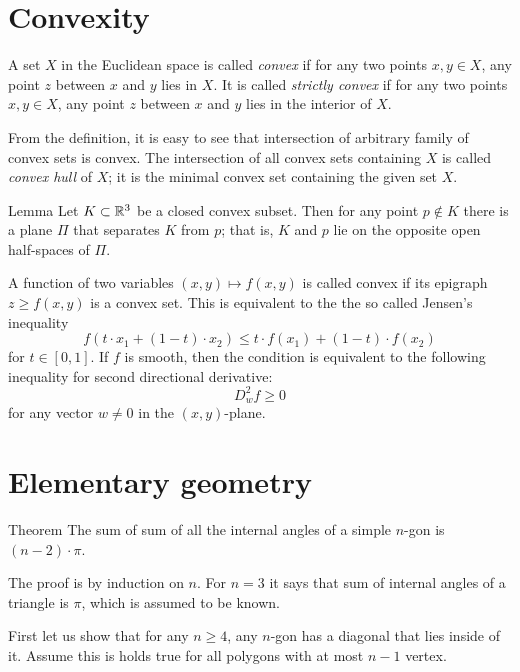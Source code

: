 \section{Convexity}

A set $X$ in the Euclidean space is called \emph{convex} if for any two points $x,y\in X$, any point $z$ between $x$ and $y$ lies in $X$.
It is called  \emph{strictly convex} if for any two points $x,y\in X$, any point $z$ between $x$ and $y$ lies in the interior of $X$.

From the definition, it is easy to see that intersection of arbitrary family of convex sets is convex. 
The intersection of all convex sets containing $X$ is called \emph{convex hull} of $X$;
it is the minimal convex set containing the given set $X$.


\begin{thm}{Lemma}\label{lem:separation}
Let $K\subset \mathbb{R}^3$ be a closed convex subset.
Then for any point $p\notin K$ there is a plane $\Pi$ that separates $K$ from $p$;
that is, $K$ and $p$ lie on the opposite open half-spaces of $\Pi$.
\end{thm}

A function of two variables $(x,y)\mapsto f(x,y)$ is called convex if 
its epigraph $z\ge f(x,y)$ is a convex set.
This is equivalent to the the so called Jensen's inequality
\[f \left (t\cdot x_1 + (1-t)\cdot x_2 \right ) \leq t\cdot f(x_1)+ (1-t)\cdot f(x_2)\]
for $t\in[0,1]$.
If $f$ is smooth, then the condition is equivalent to the following inequality for second directional derivative:
\[D^2_wf\ge 0\]
for any vector $w\ne 0$ in the $(x,y)$-plane.



\section{Elementary geometry}

\begin{thm}{Theorem}\label{thm:sum=(n-2)pi}
The sum of sum of all the internal angles of a simple $n$-gon is $(n-2)\cdot\pi$. 
\end{thm}


The proof is by induction on $n$.
For $n=3$ it says that sum of internal angles of a triangle is $\pi$, which is assumed to be known.

First let us show that for any $n\ge4$, any $n$-gon has a diagonal that lies inside of it.
Assume this is holds true for all polygons with at most $n-1$ vertex.

